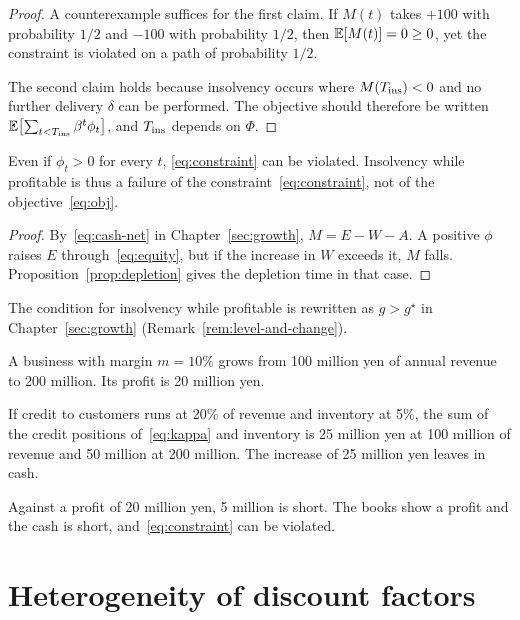 \begin{proof}
A counterexample suffices for the first claim. If $M(t)$ takes $+100$ with probability
$1/2$ and $-100$ with probability $1/2$, then $\mathbb{E}[M(t)]=0\geq 0$, yet the constraint is
violated on a path of probability $1/2$.

The second claim holds because insolvency occurs where $M(T_{\mathrm{ins}})<0$ and no further delivery
$\delta$ can be performed. The objective should therefore be written
$\mathbb{E}\bigl[\sum_{t<T_{\mathrm{ins}}}\beta^t\phi_t\bigr]$, and $T_{\mathrm{ins}}$ depends on $\Phi$.
\end{proof}

\begin{corollary}
\label{cor:insolvency-with-profit}
Even if $\phi_t>0$ for every $t$, \eqref{eq:constraint} can be violated. Insolvency while
profitable is thus a failure of the constraint~\eqref{eq:constraint}, not of the
objective~\eqref{eq:obj}.
\end{corollary}

\begin{proof}
By~\eqref{eq:cash-net} in Chapter~\ref{sec:growth}, $M=E-W-A$. A positive $\phi$ raises $E$
through~\eqref{eq:equity}, but if the increase in $W$ exceeds it, $M$ falls.
Proposition~\ref{prop:depletion} gives the depletion time in that case.
\end{proof}

The condition for insolvency while profitable is rewritten as $g>g^\star$ in
Chapter~\ref{sec:growth} (Remark~\ref{rem:level-and-change}).

\begin{example}
\label{ex:insolvency}
A business with margin $m=10\%$ grows from 100 million yen of annual revenue to 200 million.
Its profit is 20 million yen.

If credit to customers runs at 20\% of revenue and inventory at 5\%, the sum of the credit
positions of~\eqref{eq:kappa} and inventory is 25 million yen at 100 million of revenue and
50 million at 200 million. The increase of 25 million yen leaves in cash.

Against a profit of 20 million yen, 5 million is short. The books show a profit and the cash
is short, and~\eqref{eq:constraint} can be violated.
\end{example}

\section{Heterogeneity of discount factors}

